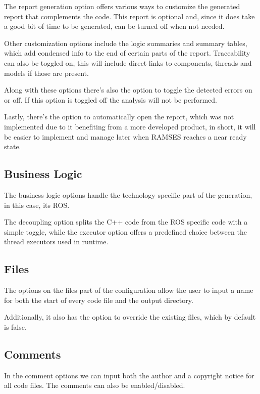 The report generation option offers various ways to customize the generated report that complements the code. This report is optional and, since it does take a good bit of time to be generated, can be turned off when not needed.

Other customization options include the logic summaries and summary tables, which add condensed info to the end of certain parts of the report. Traceability can also be toggled on, this will include direct links to components, threads and models if those are present.

Along with these options there's also the option to toggle the detected errors on or off. If this option is toggled off the analysis will not be performed.

Lastly, there's the option to automatically open the report, which was not implemented due to it benefiting from a more developed product, in short, it will be easier to implement and manage later when \gls{RAMSES} reaches a near ready state.


\subsection{Business Logic}
\label{sec:dsl_business_logic}

The business logic options handle the technology specific part of the generation, in this case, its \gls{ROS}. 

The decoupling option splits the C++ code from the \gls{ROS} specific code with a simple toggle, while the executor option offers a predefined choice between the thread executors used in runtime.


\subsection{Files}
\label{sec:dsl_files}

The options on the files part of the configuration allow the user to input a name for both the start of every code file and the output directory.

Additionally, it also has the option to override the existing files, which by default is false.



\subsection{Comments}
\label{sec:dsl_comments}

In the comment options we can input both the author and a copyright notice for all code files. The comments can also be enabled/disabled. 

